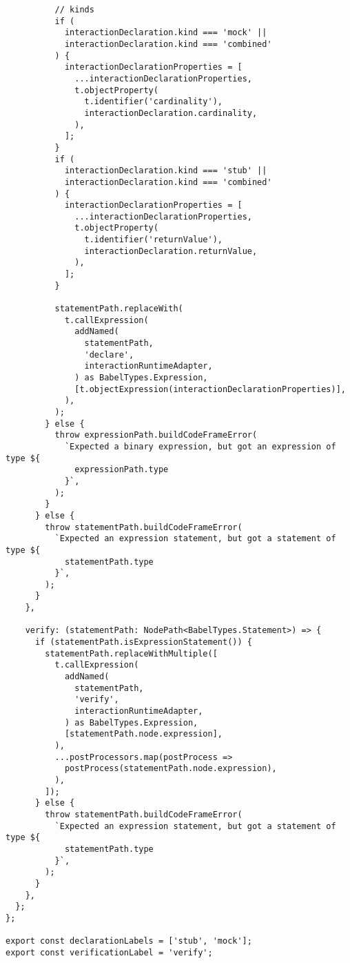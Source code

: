 \begin{verbatim}
          // kinds
          if (
            interactionDeclaration.kind === 'mock' ||
            interactionDeclaration.kind === 'combined'
          ) {
            interactionDeclarationProperties = [
              ...interactionDeclarationProperties,
              t.objectProperty(
                t.identifier('cardinality'),
                interactionDeclaration.cardinality,
              ),
            ];
          }
          if (
            interactionDeclaration.kind === 'stub' ||
            interactionDeclaration.kind === 'combined'
          ) {
            interactionDeclarationProperties = [
              ...interactionDeclarationProperties,
              t.objectProperty(
                t.identifier('returnValue'),
                interactionDeclaration.returnValue,
              ),
            ];
          }

          statementPath.replaceWith(
            t.callExpression(
              addNamed(
                statementPath,
                'declare',
                interactionRuntimeAdapter,
              ) as BabelTypes.Expression,
              [t.objectExpression(interactionDeclarationProperties)],
            ),
          );
        } else {
          throw expressionPath.buildCodeFrameError(
            `Expected a binary expression, but got an expression of type ${
              expressionPath.type
            }`,
          );
        }
      } else {
        throw statementPath.buildCodeFrameError(
          `Expected an expression statement, but got a statement of type ${
            statementPath.type
          }`,
        );
      }
    },

    verify: (statementPath: NodePath<BabelTypes.Statement>) => {
      if (statementPath.isExpressionStatement()) {
        statementPath.replaceWithMultiple([
          t.callExpression(
            addNamed(
              statementPath,
              'verify',
              interactionRuntimeAdapter,
            ) as BabelTypes.Expression,
            [statementPath.node.expression],
          ),
          ...postProcessors.map(postProcess =>
            postProcess(statementPath.node.expression),
          ),
        ]);
      } else {
        throw statementPath.buildCodeFrameError(
          `Expected an expression statement, but got a statement of type ${
            statementPath.type
          }`,
        );
      }
    },
  };
};

export const declarationLabels = ['stub', 'mock'];
export const verificationLabel = 'verify';
\end{verbatim}

